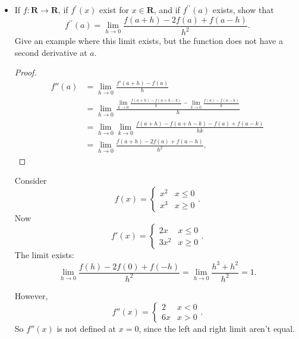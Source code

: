 \begin{itemize}
\item [28.O.] If $f: \boldsymbol{R} \rightarrow \boldsymbol{R}$, if $f^{\prime}(x)$ exist for $x \in \boldsymbol{R}$, and if $f^{\prime \prime}(a)$ exists, show that
\[
f^{\prime \prime}(a)=\lim _{h \rightarrow 0} \frac{f(a+h)-2 f(a)+f(a-h)}{h^2} .
\]
Give an example where this limit exists, but the function does not have a second derivative at $a$.
\begin{proof}
	\begin{align*}
		f''(a) &= \lim_{h \to 0} \frac{f'(a+h) - f(a)}{h}\\
		&= \lim_{h \to 0} \frac{\lim_{k \to 0} \frac{f(a+h)-f(a+h-k)}{k} - \lim_{k \to 0} \frac{f(a) - f(a-k)}{k}}{h}\\
		&= \lim_{h \to 0} \lim_{k \to 0} \frac{f(a+h) - f(a+h-k) - f(a) + f(a-k)}{hk} \\
		&= \lim_{h \to 0} \frac{f(a+h) - 2f(a) + f(a-h)}{h^2}
	.\end{align*}
\end{proof}
\begin{example}
	Consider
	\[
		f(x) = \begin{cases}
			x^2 & x \le 0 \\
			x^3 & x \ge 0
		\end{cases}
	.\] 
	Now 
	\[
		f'(x) = \begin{cases}
			2x & x \le 0 \\
			3x^2 & x \ge 0
		\end{cases}
	.\] 
	The limit exists:
	\[
		\lim_{h \to 0} \frac{f(h)- 2 f(0) + f(-h)}{h^2} = \lim_{h \to 0} \frac{h^3 + h^2}{h^2} = 1
	.\] 

	However, 
	\[
		f''(x) = \begin{cases}
			2 & x < 0 \\
			6x & x > 0
		\end{cases}
	.\] 
	So $f''(x)$ is not defined at $x = 0$, since the left and right limit aren't equal.
\end{example}

\end{itemize}
